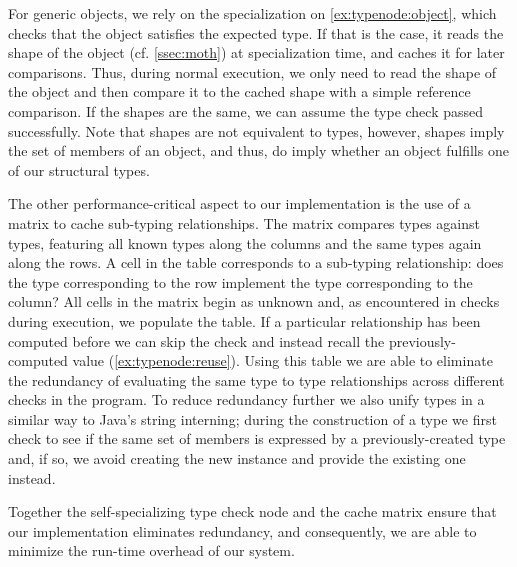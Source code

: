 For generic objects, we rely on the specialization on \cref{ex:typenode:object},
which checks that the object satisfies the expected type.
If that is the case, it reads the shape of the object (cf. \cref{ssec:moth}) at specialization time,
and caches it for later comparisons.
Thus, during normal execution,
we only need to read the shape of the object and then compare it to the cached shape
with a simple reference comparison.
If the shapes are the same, we can assume the type check passed successfully.
Note that shapes are not equivalent to types,
however, shapes imply the set of members of an object, and thus,
do imply whether an object fulfills one of our structural types.

The other performance-critical aspect to our implementation
is the use of a matrix to cache sub-typing relationships.
The matrix compares types against types,
featuring all known types along the columns and the same types again along the rows.
A cell in the table corresponds to a sub-typing relationship:
does the type corresponding to the row implement
the type corresponding to the column?
All cells in the matrix begin as unknown and, as
encountered in checks during execution, we populate the table.
If a particular relationship has been computed before
we can skip the check and instead recall the previously-computed value
(\cref{ex:typenode:reuse}).
Using this table we are able to eliminate the redundancy of evaluating
the same type to type relationships across different checks in the program. To reduce redundancy further we also unify types in a similar way to Java's string interning; 
during the construction of a type we first check to see if the same
set of members is expressed by a previously-created type and, if so,
we avoid creating the new instance and provide the existing one instead.


Together the self-specializing type check node and the cache matrix 
ensure that our implementation eliminates redundancy, and
consequently, we are able to minimize the run-time overhead of our system. 



